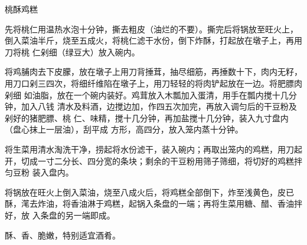 \begin{recipe}{桃酥鸡糕}

\ingredients


\preparation

\step 先将桃仁用温热水泡十分钟，撕去粗皮（油烂的不要）。撕完后将锅放至旺火上，
倒入菜油半斤，烧至五成火，将桃仁滤干水份，倒下炸酥，打起放在墩子上，再用刀将桃
仁剁细（绿豆大）放入碗内。

\step 将鸡脯肉去下皮朦，放在墩子上用刀背捶茸，抽尽细筋，再捶数十下，肉内无籽，
用刀口剁三四次，将细纤维陷在墩子上，用刀轻轻的将肉铲起放在一边。将肥膘肉剁细
如油脂，放在一个碗内装好。鸡茸放入木瓢加入蛋清，用手在瓢内搅十几分钟，加入八钱
清水及料酒，边搅边加，作四五次加完，再放入调匀后的干豆粉及剁好的猪肥膘、桃
仁、味精，搅十几分钟，再加盐搅十几分钟，装入九寸盘内（盘心抹上一层油），刮平成
方形，高四分，放入笼内蒸十分钟。

\step 将生菜用清水淘洗干净，捞起将水份滤干，装入碗内；再取出笼内的鸡糕，用刀起
开，切成一寸二分长、四分宽的条块；剩余的干豆粉用筛子筛细，将切好的鸡糕拌匀豆粉
装入盘内。

\step 将锅放在旺火上倒入菜油，烧至八成火后，将鸡糕全部倒下，炸至浅黄色，皮已
酥，滗去炸油，将香油淋于鸡糕，起锅入条盘的一端；再将生菜用糖、醋、香油拌好，放
入条盘的另一端即成。

\features

酥、香、脆嫩，特别适宜酒肴。

\end{recipe}

